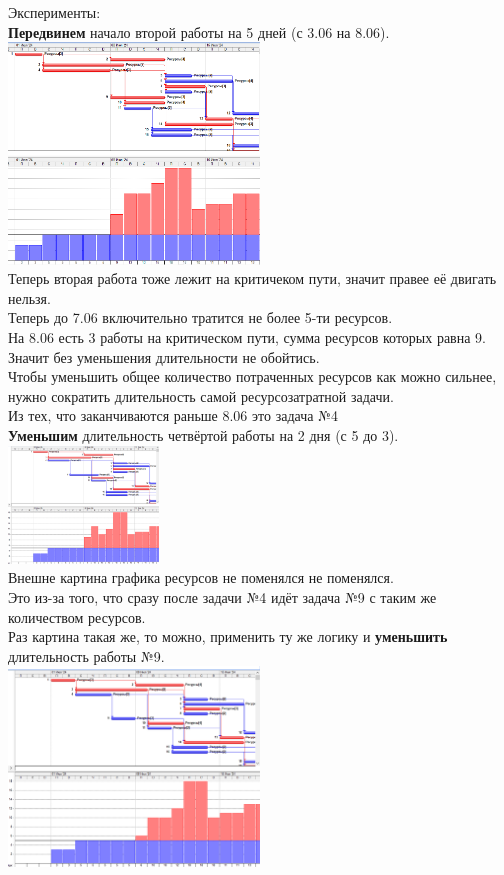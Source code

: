 \documentclass[14pt]{article}
\begin{document}
	Эксперименты:\\
	\textbf{Передвинем }начало второй работы на 5 дней (с 3.06 на 8.06).\\
	\includegraphics[width=0.5\textwidth]{../img/ot1a1_1.png}\\
	Теперь вторая работа тоже лежит на критичеком пути, значит правее её двигать нельзя.\\
	Теперь до 7.06 включительно тратится не более 5-ти ресурсов.\\
	На 8.06 есть 3 работы на критическом пути, сумма ресурсов которых равна 9.\\
	Значит без уменьшения длительности не обойтись.\\
	Чтобы уменьшить общее количество потраченных ресурсов как можно сильнее,
		нужно сократить длительность самой ресурсозатратной задачи.\\
	Из тех, что заканчиваются раньше 8.06 это задача №4\\
	\textbf{Уменьшим} длительность четвёртой работы на 2 дня (с 5 до 3).\\
	\includegraphics[width=0.3\textwidth]{../img/ot1a1_2.png}\\
	Внешне картина графика ресурсов не поменялся не поменялся.\\
	Это из-за того, что сразу после задачи №4 идёт задача №9 с таким же количеством ресурсов.\\
	Раз картина такая же, то можно, применить ту же логику и \textbf{уменьшить} длительность работы №9.\\
	\includegraphics[width=0.5\textwidth]{../img/ot1a1_3.png}\\
\end{document}
